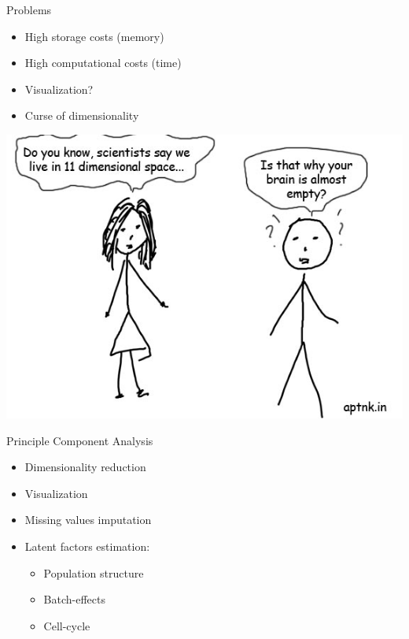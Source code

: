 \documentclass{beamer}\usepackage[]{graphicx}\usepackage[]{color}
\begin{document}
\begin{frame}{Problems}
  \begin{itemize}
    \item High storage costs (memory)
    \item High computational costs (time)
    \item Visualization?
    \item Curse of dimensionality
  \end{itemize}
  \begin{center}
    \includegraphics[width=.5\linewidth]{curse_dim.jpg}
  \end{center}
\end{frame}

\begin{frame}{Principle Component Analysis}
  \begin{itemize}
    \item Dimensionality reduction
    \item Visualization
    \item Missing values imputation
    \item Latent factors estimation:
      \begin{itemize}
        \item Population structure
        \item Batch-effects
        \item Cell-cycle
      \end{itemize}
  \end{itemize}
\end{frame}
\end{document}
